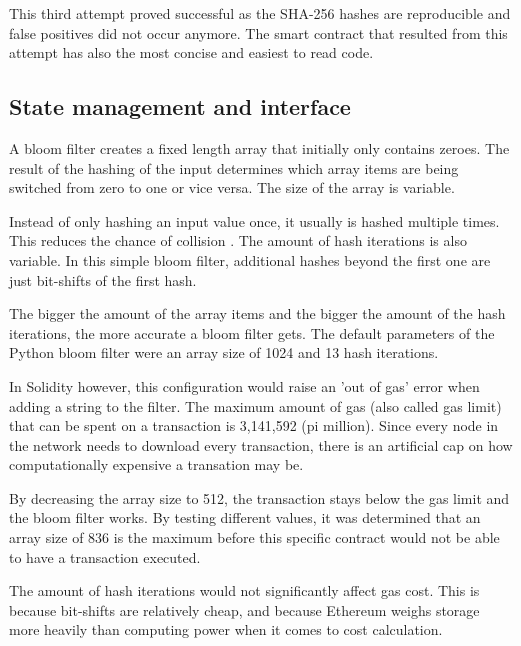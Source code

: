 This third attempt proved successful as the SHA-256 hashes are reproducible and false positives did not occur anymore. The smart contract that resulted from this attempt has also the most concise and easiest to read code.

\subsection{State management and interface}

A bloom filter creates a fixed length array that initially only contains zeroes. The result of the hashing of the input determines which array items are being switched from zero to one or vice versa. The size of the array is variable.

Instead of only hashing an input value once, it usually is hashed multiple times. This reduces the chance of collision \cite{MultipleHashes}. The amount of hash iterations is also variable. In this simple bloom filter, additional hashes beyond the first one are just bit-shifts of the first hash.

The bigger the amount of the array items and the bigger the amount of the hash iterations, the more accurate a bloom filter gets. The default parameters of the Python bloom filter were an array size of 1024 and 13 hash iterations. \cite{SimpleBloomFilter} 

In Solidity however, this configuration would raise an 'out of gas' error when adding a string to the filter. 
The maximum amount of gas (also called gas limit) that can be spent on a transaction is 3,141,592 (pi million). Since every node in the network needs to download every transaction, there is an artificial cap on how computationally expensive a transation may be.

By decreasing the array size to 512, the transaction stays below the gas limit and the bloom filter works. 
By testing different values, it was determined that an array size of 836 is the maximum before this specific contract would not be able to have a transaction executed.

The amount of hash iterations would not significantly affect gas cost. This is because bit-shifts are relatively cheap, and because Ethereum weighs storage more heavily than computing power when it comes to cost calculation.
